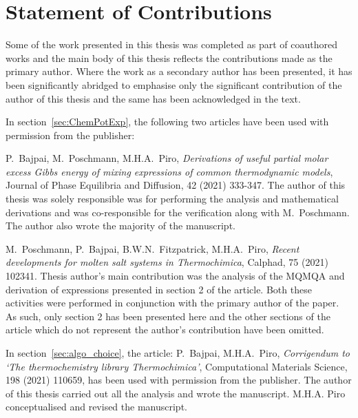 \chapter*{Statement of Contributions}
Some of the work presented in this thesis was completed as part of coauthored works and the main body of this thesis reflects the contributions made as the primary author. Where the work as a secondary author has been presented, it has been significantly abridged to emphasise only the significant contribution of the author of this thesis and the same has been acknowledged in the text. 

In section~\ref{sec:ChemPotExp}, the following two articles have been used with permission from the publisher:
\begin{enumerate}{\small \compresslist
    \item {P.\ Bajpai}, {M.\ Poschmann}, {M.H.A.\ Piro}, \textit{Derivations of useful partial molar excess Gibbs energy of mixing expressions of common thermodynamic models}, {Journal of Phase Equilibria and Diffusion, 42 (2021) 333-347}. 
The author of this thesis was solely responsible was for performing the analysis and mathematical derivations and was co-responsible for the verification along with M.\ Poschmann. The author also wrote the majority of the manuscript. 
    
    \item {M.\ Poschmann}, {P.\ Bajpai}, {B.W.N.\ Fitzpatrick}, {M.H.A.\ Piro}, \textit{Recent developments for molten salt systems in Thermochimica}, {Calphad, 75 (2021) 102341}. 
Thesis author's main contribution was the analysis of the MQMQA and derivation of expressions presented in section 2 of the article. Both these activities were performed in conjunction with the primary author of the paper. As such, only section 2 has been presented here and the other sections of the article which do not represent the author's contribution have been omitted.
   }
\end{enumerate}


In section~\ref{sec:algo_choice}, the article: {P.\ Bajpai}, {M.H.A.\ Piro}, \textit{Corrigendum to `The thermochemistry library Thermochimica'}, {Computational Materials Science, 198 (2021) 110659}, has been used with permission from the publisher. The author of this thesis carried out all the analysis and wrote the manuscript. M.H.A. Piro conceptualised and revised the manuscript.


